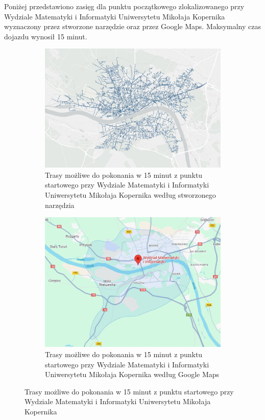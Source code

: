 \documentclass{article}
\begin{document}
Poniżej przedstawiono zasięg dla punktu początkowego zlokalizowanego przy Wydziale Matematyki i Informatyki Uniwersytetu Mikołaja Kopernika wyznaczony przez stworzone
narzędzie oraz przez Google Maps. Maksymalny czas dojazdu wynosił 15 minut.
\begin{figure}[H]
    \centering
    \begin{subfigure}[b]{0.45\textwidth}
        \centering
        \includegraphics[width=\textwidth]{img/uniwersytet-15-min.png}
        \caption{Trasy możliwe do pokonania w 15 minut z punktu startowego przy Wydziale Matematyki i Informatyki Uniwersytetu Mikołaja Kopernika według stworzonego narzędzia}
    \end{subfigure}
    \hfill
    \begin{subfigure}[b]{0.45\textwidth}
        \centering
        \includegraphics[width=\textwidth]{img/uniwersytet-15-min-google.png}
        \caption{Trasy możliwe do pokonania w 15 minut z punktu startowego przy Wydziale Matematyki i Informatyki Uniwersytetu Mikołaja Kopernika według Google Maps}
    \end{subfigure}
    \caption{Trasy możliwe do pokonania w 15 minut z punktu startowego przy Wydziale Matematyki i Informatyki Uniwersytetu Mikołaja Kopernika}
\end{figure}
\end{document}
